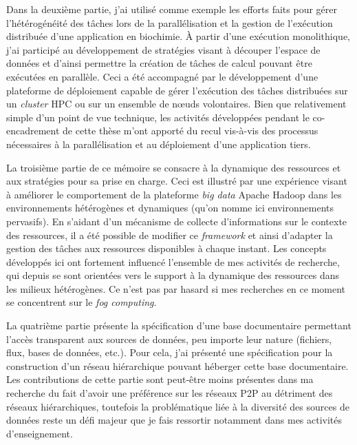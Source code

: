 Dans la deuxième partie, j'ai utilisé comme exemple les efforts faits pour gérer l'hétérogénéité des tâches lors de la parallélisation et la gestion de l'exécution distribuée d'une application en biochimie. À partir d'une exécution monolithique, j'ai participé au développement de stratégies visant à découper l'espace de données et d'ainsi permettre la création de tâches de calcul pouvant être exécutées en parallèle. Ceci a été accompagné par le développement d'une plateforme de déploiement capable de gérer l'exécution des tâches distribuées sur  un \textit{cluster} HPC ou sur un ensemble de n{\oe}uds volontaires. Bien que relativement simple d'un point de vue technique, les activités développées pendant le co-encadrement de cette thèse m'ont apporté du recul vis-à-vis des processus nécessaires à la parallélisation et au déploiement d'une application tiers.

La troisième partie de ce mémoire se consacre à la dynamique des ressources et aux stratégies pour sa prise en charge. Ceci est illustré par une expérience visant à améliorer le comportement de la plateforme \textit{big data} Apache Hadoop dans les environnements hétérogènes et dynamiques (qu'on nomme ici environnements pervasifs). En s'aidant d'un mécanisme de collecte d'informations sur le contexte des ressources, il a été possible de modifier ce \textit{framework} et ainsi d'adapter la gestion des tâches aux ressources disponibles à chaque instant. Les concepts développés ici ont fortement influencé l'ensemble de mes activités de recherche, qui depuis se sont orientées vers le support à la dynamique des ressources dans les milieux hétérogènes. Ce n'est pas par hasard si mes recherches en ce moment se concentrent sur le \textit{fog computing}.    

La quatrième partie présente la spécification d'une base documentaire permettant l'accès transparent aux sources de données, peu importe leur nature (fichiers, flux, bases de données, etc.). Pour cela, j'ai présenté une spécification pour la construction d'un réseau hiérarchique pouvant héberger cette base documentaire. Les contributions de cette partie sont peut-être moins présentes dans ma recherche du fait d'avoir une préférence sur les réseaux P2P au détriment des réseaux hiérarchiques, toutefois la problématique liée à la diversité des sources de données reste un défi majeur que je fais ressortir notamment dans mes activités d'enseignement.

